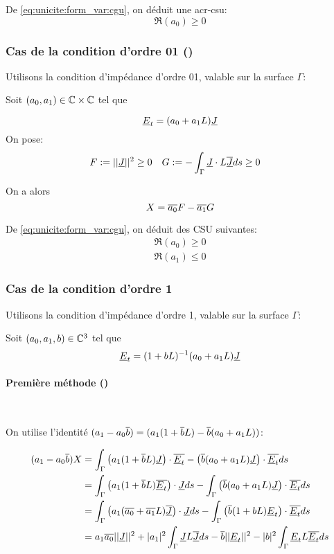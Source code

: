 De \eqref{eq:unicite:form_var:cgu}, on déduit une \gls{acr-csu}:
\begin{equation}
\Re\left(a_0\right) \ge 0
\end{equation}

\subsubsection{Cas de la condition d'ordre 01 (\cite{stupfel_sufficient_2011})}
Utilisons la condition d’impédance d'ordre 01, valable sur la surface $\Gamma$:

Soit $(a_0, a_1) \in \mathbb C\times\mathbb C$ tel que

\[
\underline{E}_t = (a_0 +a_1L)\underline{J}
\]
On pose:
\begin{align*}
F&:= || \underline{J}|| ^2 \ge 0  & G&:= -\int_\Gamma \underline{J}\cdot L{\overline{\underline{J}}} ds \ge 0
\end{align*}

On a alors
\begin{equation*}
X = {\overline{a_0}}F - {\overline{a_1}}G
\end{equation*}

De \eqref{eq:unicite:form_var:cgu}, on déduit des CSU suivantes:
\begin{align}
\Re\left(a_0\right) \ge 0\\
\Re\left(a_1\right) \le 0
\end{align}
\subsubsection{Cas de la condition d'ordre 1}


Utilisons la condition d’impédance d'ordre 1, valable sur la surface $\Gamma$: 

Soit $(a_0, a_1,b) \in \mathbb C^3$ tel que
\[
\underline{E}_t = (1 + b L)^{-1} (a_0 + a_1 L) \underline{J}
\]

\paragraph{Première méthode (\cite{stupfel_sufficient_2011})}~

On utilise l'identité $(a_1-a_0{\overline{b}}) = (a_1(1+{\overline{b}}L) - {\overline{b}}(a_0+a_1L))$:

\begin{align*}
(a_1-a_0{\overline{b}})X &= \int_\Gamma \left(a_1(1+{\overline{b}}L) \underline{J}\right)\cdot{\overline{\underline{E}_t}} - \left({\overline{b}}(a_0+a_1L)\underline{J}\right)\cdot{\overline{\underline{E}_t}} ds\\
&= \int_\Gamma \left(a_1(1+{\overline{b}}L) {\overline{\underline{E}_t}}\right)\cdot\underline{J} ds - \int_\Gamma \left({\overline{b}}(a_0+a_1L)\underline{J}\right)\cdot{\overline{\underline{E}_t}} ds\\
&= \int_\Gamma \left(a_1({\overline{a_0}}+{\overline{a_1}}L) {\overline{\underline{J}}}\right)\cdot\underline{J} ds  - \int_\Gamma \left({\overline{b}}(1+bL)\underline{E}_t\right)\cdot{\overline{\underline{E}_t}} ds\\
&= a_1{\overline{a_0}} ||\underline{J}||^2 + |a_1|^2 \int_\Gamma \underline{J} L {\overline{\underline{J}}} ds - {\overline{b}} ||\underline{E}_t||^2 - |b|^2 \int_\Gamma \underline{E}_t L {\overline{\underline{E}_t}} ds
\end{align*}

